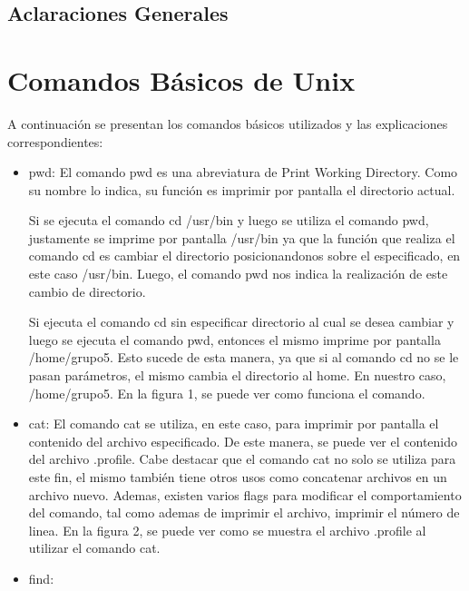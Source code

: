 \documentclass[a4paper, 12pt]{article}
\begin{document}
\tableofcontents
\newpage
\begin{center}
\section*{Aclaraciones Generales}
\end{center}

\section*{Comandos B\'asicos de Unix}

A continuaci\'on se presentan los comandos b\'asicos utilizados y las explicaciones correspondientes:
\begin{itemize}
\item pwd: El comando pwd es una abreviatura de Print Working Directory. Como su nombre lo indica, su funci\'on es imprimir por pantalla el directorio actual.

Si se ejecuta el comando cd /usr/bin y luego se utiliza el comando pwd, justamente se imprime por pantalla /usr/bin ya que la funci\'on que realiza el comando cd es cambiar el directorio posicionandonos sobre el especificado, en este caso /usr/bin. Luego, el comando pwd nos indica la realizaci\'on de este cambio de directorio.

Si ejecuta el comando cd sin especificar directorio al cual se desea cambiar y luego se ejecuta el comando pwd, entonces el mismo imprime por pantalla /home/grupo5. Esto sucede de esta manera, ya que si al comando cd no se le pasan par\'ametros, el mismo cambia el directorio al home. En nuestro caso, /home/grupo5. En la figura 1, se puede ver como funciona el comando.

\item cat: El comando cat se utiliza, en este caso, para imprimir por pantalla el contenido del archivo especificado. De este manera, se puede ver el contenido del archivo .profile. Cabe destacar que el comando cat no solo se utiliza para este fin, el mismo tambi\'en tiene otros usos como concatenar archivos en un archivo nuevo. Ademas, existen varios flags para modificar el comportamiento del comando, tal como ademas de imprimir el archivo, imprimir el n\'umero de linea. En la figura 2, se puede ver como se muestra el archivo .profile al utilizar el comando cat.

\item find:


\end{itemize}
\end{document}
